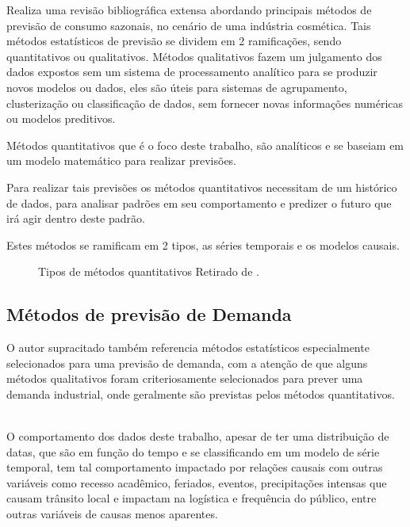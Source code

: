 \documentclass[	12pt, Times, openright, twoside, a4paper, english, brazil]{abntex2}
\begin{document}
          \cite{Junior2007} Realiza uma revisão bibliográfica extensa abordando principais métodos de previsão de consumo sazonais, no cenário de uma indústria cosmética. Tais métodos estatísticos de previsão se dividem em 2 ramificações, sendo quantitativos ou qualitativos. Métodos qualitativos fazem um julgamento dos dados expostos sem um sistema de processamento analítico para se produzir novos modelos ou dados, eles são úteis para sistemas de agrupamento, clusterização ou classificação de dados, sem fornecer novas informações numéricas ou modelos preditivos.

          Métodos quantitativos que é o foco deste trabalho, são analíticos e se baseiam em um modelo matemático para realizar previsões. 

          Para realizar tais previsões os métodos quantitativos necessitam de um histórico de dados, para analisar padrões em seu comportamento e predizer o futuro que irá agir dentro deste padrão.

          Estes métodos se ramificam em 2 tipos, as séries temporais e os modelos causais.
          \begin{figure}[!ht]
          	\caption{Tipos de métodos quantitativos Retirado de \cite{Junior2007}.\label{fig:metodosQuantitativos}}
          \end{figure}

        \subsection{Métodos de previsão de Demanda}
          O autor supracitado também referencia métodos estatísticos especialmente selecionados para uma previsão de demanda, com a atenção de que alguns métodos qualitativos foram criteriosamente selecionados para prever uma demanda industrial, onde geralmente são previstas pelos métodos quantitativos.

          \\O comportamento dos dados deste trabalho, apesar de ter uma distribuição de datas, que são em função do tempo e se classificando em um modelo de série temporal, tem tal comportamento impactado por relações causais com outras variáveis como recesso acadêmico, feriados, eventos, precipitações intensas que causam trânsito local e impactam na logística e frequência do público, entre outras variáveis de causas menos aparentes.
\end{document}
